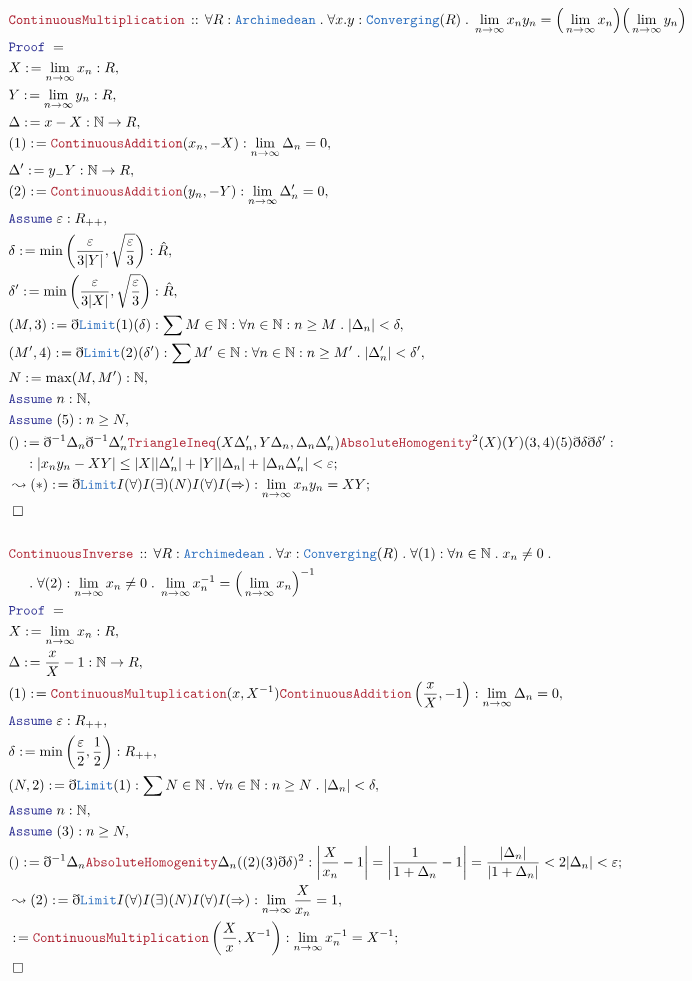 \documentclass[12pt]{scrartcl}
\newcommand{\TYPE}[1]{\textcolor{NavyBlue}{\mathtt{#1}}}
\newcommand{\LOGIC}[1]{\textcolor{Blue}{\mathtt{#1}}}
\newcommand{\THM}[1]{\textcolor{Maroon}{\mathtt{#1}}}
\renewcommand{\.}{\; . \;}
\newcommand{\de}{: \kern 0.1pc =}
\newcommand{\Theorem}[2]{& \THM{#1} \, :: \, #2 \\ & \Proof = \\ }
\newcommand{\NewLine}{\\ & \kern 1pc}
\newcommand{\Page}[1]{ \begin{align*} #1 \end{align*}   }
\newcommand{ \bd }{ \ByDef }
\newcommand{\Nat}{\mathbb{N} }
\newcommand{\Say}[3]{& #1 \de #2 : #3, \\}
\newcommand{\Conclude}[3]{& #1 \de #2 : #3; \\}
\newcommand{\Derive}[3]{& \leadsto #1 \de #2 : #3, \\}
\newcommand{\DeriveConclude}[3]{& \leadsto #1 \de #2 : #3 ; \\}
\newcommand{\Assume}[2]{& \LOGIC{Assume} \;#1 : #2, \\}
\newcommand{\QED}{\; \square}
\newcommand{\EndProof}{& \QED \\}
\newcommand{\ByDef}{\eth}
\newcommand{\Proof}{\LOGIC{Proof} \; }
\begin{document}
\Page{
	\Theorem{ContinuousMultiplication}{\forall R : \TYPE{Archimedean} \. \forall x.y : \TYPE{Converging}(R) \.
		\lim_{n \to \infty} x_ny_n = \Big( \lim_{n \to \infty} x_n \Big)\Big( \lim_{n \to \infty} y_n \Big) 
	}
	\Say{X}{\lim_{n \to \infty} x_n}{R}
	\Say{Y}{\lim_{n \to \infty} y_n}{R}
	\Say{\Delta}{  x - X    }{\Nat \to R}
	\Say{(1)}{ \THM{ContinuousAddition}(x_n,-X)}{ \lim_{n \to \infty} \Delta_n = 0}
	\Say{\Delta'}{  y_ - Y    }{\Nat \to R}
	\Say{(2)}{ \THM{ContinuousAddition}(y_n,-Y)}{ \lim_{n \to \infty} \Delta'_n = 0}
	\Assume{\varepsilon}{R_{++}}
	\Say{\delta}{\min\left( \frac{\varepsilon}{3|Y|}, \sqrt{\frac{\varepsilon}{3}}  \right)}{\hat R}
	\Say{\delta'}{\min\left( \frac{\varepsilon}{3|X|}, \sqrt{\frac{\varepsilon}{3}}    \right)}{\hat R}
	\Say{(M,3)}{ \bd \TYPE{Limit}(1)(\delta) }
	{ \sum M \in \Nat : \forall n \in \Nat : n \ge M \. |\Delta_n| < \delta  }
	\Say{(M',4)}{\bd \TYPE{Limit}(2)(\delta')}
	{ \sum M' \in \Nat : \forall n \in \Nat : n \ge M' \. |\Delta_n'| < \delta'  }
	\Say{N}{\max(M,M')}{\Nat}
	\Assume{n}{\Nat}
	\Assume{(5)}{n \ge  N}
	\Conclude{()}{\bd^{-1} \Delta_n \bd^{-1} \Delta_n' \THM{TriangleIneq}(X\Delta'_n,Y\Delta_n,\Delta_n\Delta'_n) 
		\THM{AbsoluteHomogenity}^2(X)(Y)(3,4)(5)\bd \delta \bd \delta'   }
	{ \NewLine :
		| x_ny_n - XY | \le  |X|| \Delta'_n| + |Y|| \Delta_n | + |\Delta_n \Delta'_n| < \varepsilon }
	\DeriveConclude{(*)}{\bd \TYPE{Limit}I(\forall)I(\exists)(N)I(\forall)I(\Rightarrow)}
	{\lim_{n \to \infty} x_n y_n = XY}
	\EndProof
	\\
	\Theorem{ContinuousInverse}{\forall R : \TYPE{Archimedean} \. \forall x : \TYPE{Converging}(R) \.
		\forall (1) : \forall n \in \Nat \. x_n \neq 0 \. 
		\NewLine \.
		\forall (2) : \lim_{n \to \infty} x_n \neq 0 \.
		\lim_{n \to \infty} x_n^{-1} = \Big( \lim_{n \to \infty} x_n \Big)^{-1}
	}
	\Say{X}{\lim_{n \to \infty} x_n}{ R  }
	\Say{\Delta}{ \frac{x}{X} - 1  }{\Nat \to R}
	\Say{(1)}{\THM{ContinuousMultuplication}(x,X^{-1}) \THM{ContinuousAddition}\left( \frac{x}{X}, - 1 \right)} 
	{ \lim_{n \to \infty} \Delta_n = 0 }
	\Assume{\varepsilon}{R_{++}}
	\Say{\delta}{\min\left(  \frac{\varepsilon}{2}  , \frac{1}{2}  \right)}{R_{++}}
	\Say{(N,2)}{ \bd \TYPE{Limit}(1)  }{ \sum N \in \Nat \. \forall n \in \Nat : n \ge N \. |\Delta_n| < \delta }
	\Assume{n}{\Nat}
	\Assume{(3)}{ n \ge N    }
	\Conclude{()}{ \bd^{-1} \Delta_n \THM{AbsoluteHomogenity}{\Delta_n}((2)(3) \bd \delta)^2   }
	{ \left| \frac{X}{x_n} - 1 \right| = \left| \frac{1}{1 + \Delta_n}  - 1 \right| =  \frac{|\Delta_n|}{|1 + \Delta_n|} <   
	 2|\Delta_n| < \varepsilon 
	}
	\Derive{(2)}{\bd \TYPE{Limit}I(\forall)I(\exists)(N)I(\forall)I(\Rightarrow)}
	{\lim_{n \to \infty} \frac{X}{x_n} = 1}
	\Conclude{}{\THM{ContinuousMultiplication}\left( \frac{X}{x}, X^{-1}  \right)}{ \lim_{n \to \infty} x^{-1}_n = X^{-1}}
	\EndProof
}
\end{document}
